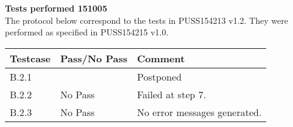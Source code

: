 \renewcommand{\testdate}{151005}
\textbf{Tests performed \testdate} \\
The protocol below correspond to the tests in PUSS154213 v1.2. They were performed as specified in PUSS154215 v1.0.
\begin{center}
  		\begin{tabular}{| p{3cm} | p{5cm} | p{5cm} |}
    		\hline
	    	\textbf{Testcase}			& \textbf{Pass/No Pass} 	& \textbf{Comment} \\ \hline
    		B.2.1		 						& 									& Postponed 				\\ \hline
    		B.2.2		 						& No Pass 										& Failed at step 7.				 \\	\hline
    		B.2.3		 						& No Pass 										& No error messages generated.				 \\	\hline
 		\end{tabular}
\end{center}